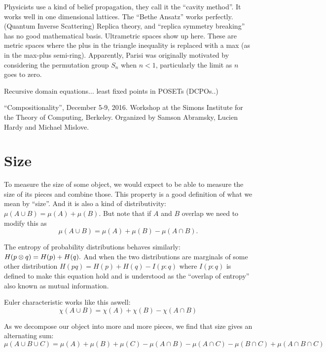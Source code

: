 \documentclass[11pt]{article}
\begin{document}
Physicists use a kind of belief propagation, they call it the ``cavity method''. 
It works well in one dimensional lattices. The ``Bethe Ansatz'' works perfectly.
(Quantum Inverse Scattering)
Replica theory, and ``replica symmetry breaking'' has no good mathematical basis.
Ultrametric spaces show up here. These are metric spaces where
the plus in the triangle inequality is replaced with a max (as in the max-plus semi-ring).
Apparently, Parisi was originally motivated by considering
the permutation group $S_n$ when $n<1$, particularly the limit as $n$ goes to zero.

Recursive domain equations... least fixed points in POSETs (DCPOs..)



``Compositionality'', December 5-9, 2016.
Workshop at the Simons Institute for 
the Theory of Computing, Berkeley. 
Organized by Samson Abramsky, Lucien Hardy and Michael Mislove.


\section{Size}

To measure the size of some object, we would
expect to be able to measure the size of its pieces
and combine those. 
This property is a good definition of what we
mean by ``size''. And it is also a kind of
distributivity: 
$\mu(A\cup B) = \mu(A) + \mu(B).$
But note that if $A$ and $B$ overlap we need to modify this
as
$$\mu(A\cup B) = \mu(A) + \mu(B) - \mu(A\cap B).$$

The entropy of probability distributions behaves similarly:
$H(p\otimes q) = H(p) + H(q).$
And when the two distributions are marginals of some other distribution
$H(pq) = H(p) + H(q) - I(p:q)$
where $I(p:q)$ is defined to make this equation hold and is
understood as the ``overlap of entropy'' also known as mutual information.

Euler characteristic works like this aswell:
$$
\chi(A\cup B) = \chi(A) + \chi(B) - \chi(A\cap B)
$$

As we decompose our object into more and more pieces,
we find that size gives an alternating sum:
$$
\mu(A\cup B\cup C) = \mu(A) + \mu(B) + \mu(C) 
    - \mu(A\cap B) - \mu(A\cap C) - \mu(B\cap C)
    + \mu(A\cap B \cap C)
$$

\end{document}
